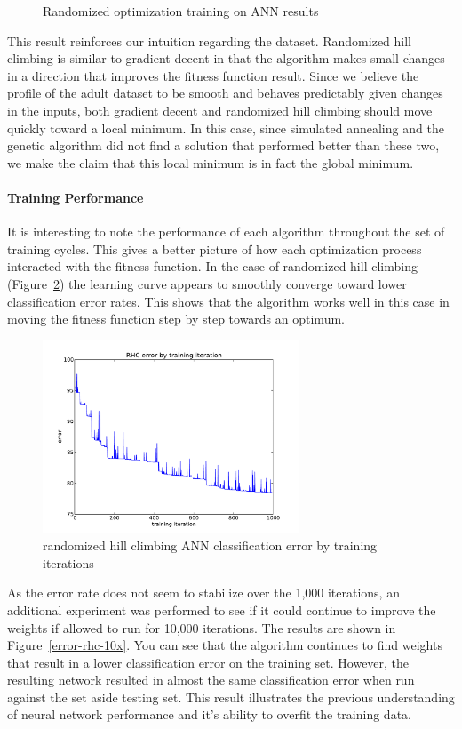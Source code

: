 \documentclass{sig-alternate}
\begin{document}
\begin{figure}[!htbp]
    \centering
    \theverbbox
    \caption{Randomized optimization training on ANN results\label{ann-error-summary}}
\end{figure}

This result reinforces our intuition regarding the dataset. Randomized hill climbing is similar to gradient decent in that the algorithm makes small changes in a direction that improves the fitness function result. Since we believe the profile of the adult dataset to be smooth and behaves predictably given changes in the inputs, both gradient decent and randomized hill climbing should move quickly toward a local minimum. In this case, since simulated annealing and the genetic algorithm did not find a solution that performed better than these two, we make the claim that this local minimum is in fact the global minimum.

\paragraph{Training Performance}

It is interesting to note the performance of each algorithm throughout the set of training cycles. This gives a better picture of how each optimization process interacted with the fitness function. In the case of randomized hill climbing (Figure~\ref{error-rhc}) the learning curve appears to smoothly converge toward lower classification error rates. This shows that the algorithm works well in this case in moving the fitness function step by step towards an optimum.

\begin{figure}[!htbp]
    \centering
    \includegraphics[width=3in]{part1.1/error-rhc.pdf}
    \caption{randomized hill climbing ANN classification error by training iterations \label{error-rhc}}
\end{figure} 

As the error rate does not seem to stabilize over the 1,000 iterations, an additional experiment was performed to see if it could continue to improve the weights if allowed to run for 10,000 iterations. The results are shown in Figure~\ref{error-rhc-10x}. You can see that the algorithm continues to find weights that result in a lower classification error on the training set. However, the resulting network resulted in almost the same classification error when run against the set aside testing set. This result illustrates the previous understanding of neural network performance and it's ability to overfit the training data.
\end{document}
